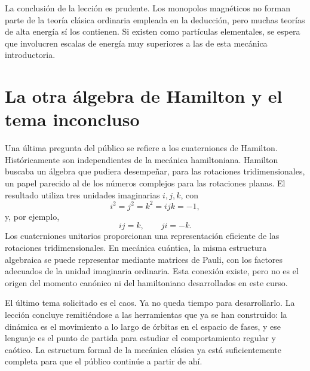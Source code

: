 La conclusión de la lección es prudente. Los monopolos magnéticos no forman parte de la teoría clásica ordinaria empleada en la deducción, pero muchas teorías de alta energía sí los contienen. Si existen como partículas elementales, se espera que involucren escalas de energía muy superiores a las de esta mecánica introductoria.

\section{La otra álgebra de Hamilton y el tema inconcluso}

Una última pregunta del público se refiere a los cuaterniones de Hamilton. Históricamente son independientes de la mecánica hamiltoniana. Hamilton buscaba un álgebra que pudiera desempeñar, para las rotaciones tridimensionales, un papel parecido al de los números complejos para las rotaciones planas. El resultado utiliza tres unidades imaginarias \(i,j,k\), con
\begin{equation}
  i^2=j^2=k^2=ijk=-1,
\end{equation}
y, por ejemplo,
\begin{equation}
  ij=k,
  \qquad
  ji=-k.
\end{equation}
Los cuaterniones unitarios proporcionan una representación eficiente de las rotaciones tridimensionales. En mecánica cuántica, la misma estructura algebraica se puede representar mediante matrices de Pauli, con los factores adecuados de la unidad imaginaria ordinaria. Esta conexión existe, pero no es el origen del momento canónico ni del hamiltoniano desarrollados en este curso.

El último tema solicitado es el caos. Ya no queda tiempo para desarrollarlo. La lección concluye remitiéndose a las herramientas que ya se han construido: la dinámica es el movimiento a lo largo de órbitas en el espacio de fases, y ese lenguaje es el punto de partida para estudiar el comportamiento regular y caótico. La estructura formal de la mecánica clásica ya está suficientemente completa para que el público continúe a partir de ahí.
